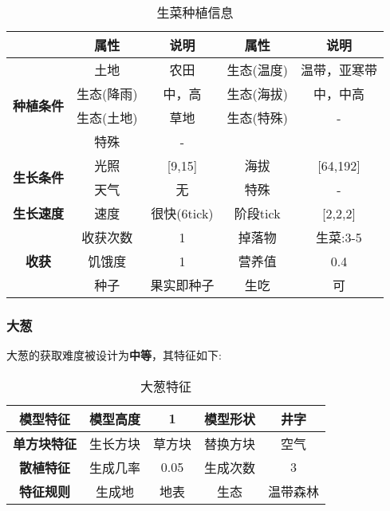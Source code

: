 \begin{table}[H]
    \centering
    \caption{生菜种植信息}
    \label{table:生菜种植信息}
    \setlength{\tabcolsep}{4mm}
    \begin{tabular}{c|cc|cc}
        \toprule
                                           & \textbf{属性} & \textbf{说明} & \textbf{属性} & \textbf{说明} \\
        \midrule
        \multirow{4}{*}{\textbf{种植条件}} & 土地          & 农田          & 生态(温度)    & 温带，亚寒带    \\
                                           & 生态(降雨)    & 中，高        & 生态(海拔)    & 中，中高            \\
                                           & 生态(土地)    & 草地          & 生态(特殊)    & -             \\
                                           & 特殊          & -                                             \\
        \midrule
        \multirow{2}{*}{\textbf{生长条件}} & 光照          & [9,15]        & 海拔          & [64,192]      \\
                                           & 天气          & 无            & 特殊          & -             \\
        \midrule
        \textbf{生长速度}                  & 速度          & 很快(6tick)     & 阶段tick      & [2,2,2]       \\
        \midrule
        \multirow{3}{*}{\textbf{收获}}     & 收获次数      & 1             & 掉落物        & 生菜:3-5      \\
                                           & 饥饿度        & 1             & 营养值        & 0.4           \\
                                           & 种子          & 果实即种子  & 生吃          & 可   \\
        \bottomrule
    \end{tabular}
\end{table}

\subsubsection{大葱}

大葱的获取难度被设计为\textbf{中等}，其特征如下:
\begin{table}[H]
    \centering
    \caption{大葱特征}
    \label{table:大葱特征}
    \setlength{\tabcolsep}{4mm}
    \begin{tabular}{c|cc|cc}
        \toprule
        \textbf{模型特征}   & 模型高度 & 1      & 模型形状 & 井字     \\
        \midrule
        \textbf{单方块特征} & 生长方块 & 草方块 & 替换方块 & 空气     \\
        \midrule
        \textbf{散植特征}   & 生成几率 & 0.05   & 生成次数 & 3        \\
        \midrule
        \textbf{特征规则}   & 生成地   & 地表   & 生态     & 温带森林 \\
        \bottomrule
    \end{tabular}
\end{table}


